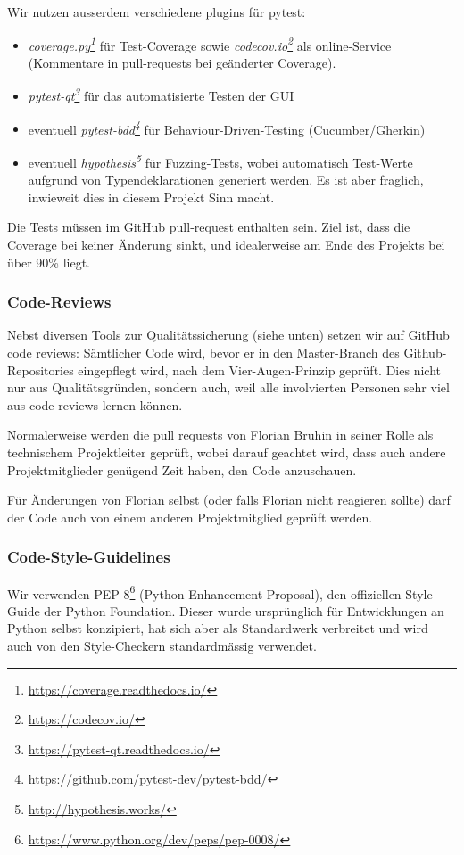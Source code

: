 \documentclass[a4paper]{article}
\newcommand{\tool}[2]{\emph{#1\footnote{\url{#2}}}}
\begin{document}
Wir nutzen ausserdem verschiedene plugins für pytest:

\begin{itemize}
\item \tool{coverage.py}{https://coverage.readthedocs.io/} für
    Test-Coverage sowie \tool{codecov.io}{https://codecov.io/}
    als online-Service (Kommentare in pull-requests bei geänderter Coverage).
\item \tool{pytest-qt}{https://pytest-qt.readthedocs.io/} für das
    automatisierte Testen der GUI
\item eventuell \tool{pytest-bdd}{https://github.com/pytest-dev/pytest-bdd/} für Behaviour-Driven-Testing (Cucumber/Gherkin)
\item eventuell \tool{hypothesis}{http://hypothesis.works/} für
  Fuzzing-Tests, wobei automatisch Test-Werte aufgrund von Typendeklarationen
  generiert werden. Es ist aber fraglich, inwieweit dies in diesem Projekt Sinn macht.
\end{itemize}

Die Tests müssen im GitHub pull-request enthalten sein. Ziel ist, dass die
Coverage bei keiner Änderung sinkt, und idealerweise am Ende des Projekts bei
über 90\% liegt.

\subsubsection{Code-Reviews}
\label{sec:codereviews}

Nebst diversen Tools zur Qualitätssicherung (siehe unten) setzen wir auf GitHub
code reviews: Sämtlicher Code wird, bevor er in den Master-Branch des
Github-Repositories eingepflegt wird, nach dem Vier-Augen-Prinzip geprüft. Dies
nicht nur aus Qualitätsgründen, sondern auch, weil alle involvierten Personen
sehr viel aus code reviews lernen können.

Normalerweise werden die pull requests von Florian Bruhin in seiner Rolle als
technischem Projektleiter geprüft, wobei darauf geachtet wird, dass auch andere
Projektmitglieder genügend Zeit haben, den Code anzuschauen.

Für Änderungen von Florian selbst (oder falls Florian nicht reagieren sollte)
darf der Code auch von einem anderen Projektmitglied geprüft werden.

\subsubsection{Code-Style-Guidelines}
Wir verwenden PEP 8\footnote{\url{https://www.python.org/dev/peps/pep-0008/}}
(Python Enhancement Proposal), den offiziellen Style-Guide der Python
Foundation. Dieser wurde ursprünglich für Entwicklungen an Python selbst
konzipiert, hat sich aber als Standardwerk verbreitet und wird auch von den
Style-Checkern standardmässig verwendet.
\end{document}
